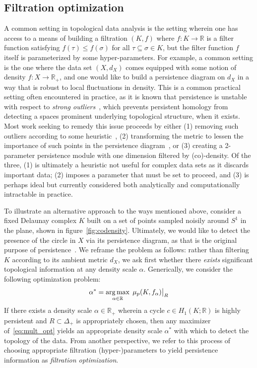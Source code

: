 \documentclass[10pt]{article}
\numberwithin{equation}{section}
\newcommand{\+}{%
	\raisebox{0.18ex}{\scaleobj{0.55}{+}}
}
\DeclareMathOperator*{\argmax}{arg\,max}
\newcommand\restr[2]{{%
  \left.\kern-\nulldelimiterspace %
  #1 %
  \vphantom{\big|} %
  \right|_{#2} %
  }}
\theoremstyle{definition}
\theoremstyle{definition}
\begin{document}
\subsection{Filtration optimization}
A common setting in topological data analysis is the setting wherein one has access to a means of building a filtration $(K,f)$ where $f : K \to \mathbb{R}$ is a filter function satisfying $f(\tau) \leq f(\sigma)$ for all $\tau \subseteq \sigma \in K$, but the filter function $f$ itself is parameterized by some hyper-parameters. 
For example, a common setting is the one where the data set $(X, d_X)$ comes equipped with some notion of density $f: X \to \mathbb{R}_+$, and one would like to build a persistence diagram on $d_X$ in a way that is robust to local fluctuations in density. 
This is a common practical setting often encountered in practice, as it is known that persistence is unstable with respect to \emph{strong outliers}~\cite{}, which prevents persistent homology from detecting a spaces prominent underlying topological structure, when it exists. 
Most work seeking to remedy this issue proceeds by either (1) removing such outliers according to some heuristic~\cite{}, (2) transforming the  metric to lessen the importance of such points in the persistence diagram~\cite{}, or (3) creating a 2-parameter persistence module with one dimension filtered by (co)-density. 
Of the three, (1) is ultimately a heuristic not useful for complex data sets as it discards important data; (2)  imposes a parameter that must be set to proceed, and (3) is perhaps ideal but currently considered both analytically and computationally intractable in practice. 

To illustrate an alternative approach to the ways mentioned above, consider a fixed Delaunay complex $K$ built on a set of points sampled noisily around $S^1$ in the plane, shown in figure~\ref{fig:codensity}. Ultimately, we would like to detect the presence of the circle in $X$ via its persistence diagram, as that is the original purpose of persistence~\cite{}. 
We reframe the problem as follows: rather than filtering $K$ according to its ambient metric $d_X$, we ask first whether there \emph{exists} significant topological information at any density scale $\alpha$. Generically, we consider the following optimization problem:   
\begin{equation}\label{eq:mult_opt}
	\alpha^\ast = \argmax_{\alpha \in \mathbb{R}} \; 
	\restr{\mu_p(K, f_\alpha)}{R}
\end{equation}
If there exists a density scale $\alpha \in \mathbb{R}_+$ wherein a cycle $c \in H_1(K ; \mathbb{R})$ is highly persistent and $R \subset \Delta_+$ is appropriately chosen, then any maximizer of~\eqref{eq:mult_opt} yields an appropriate density scale $\alpha^\ast$ with which to detect the topology of the data. 
From another perspective, we refer to this process of choosing appropriate filtration (hyper-)parameters to yield persistence information as \emph{filtration optimization}. 
\end{document}
